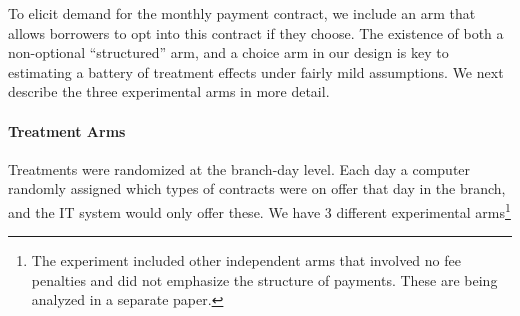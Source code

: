 \documentclass[12pt, a4paper, colorinlistoftodos]{article}
\begin{document}

To elicit demand for the monthly payment contract, we include an arm that allows borrowers to opt into this contract if they choose. The existence of both a non-optional ``structured'' arm, and a choice arm in our design is key to estimating a battery of treatment effects under fairly mild assumptions. We next describe the three experimental arms in more detail. 


\paragraph*{Treatment Arms} 
Treatments were randomized at the branch-day level. Each day a computer randomly assigned which types of contracts were on offer that day in the branch, and the IT system would only offer these.  We have 3 different experimental arms\footnote{The experiment included other independent arms that involved no fee penalties and did not emphasize the structure of payments. These are being analyzed in a separate paper.} 
\end{document}
